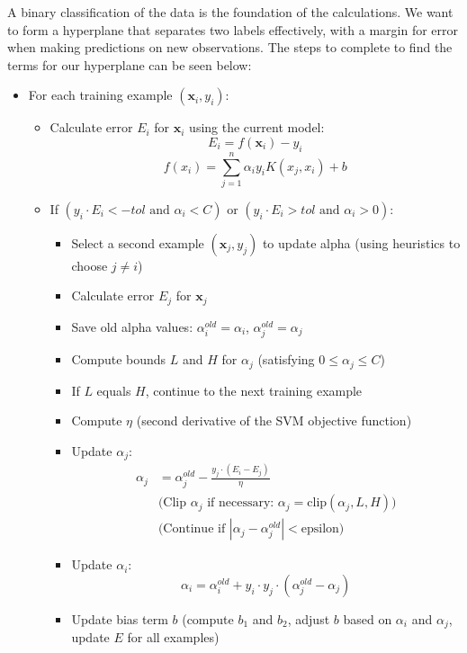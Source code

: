 \documentclass[12pt]{article}
\begin{document}
A binary classification of the data is the foundation of the calculations. We want to form a hyperplane that separates two labels effectively, with a margin for error when making predictions on new observations. The steps to complete to find the terms for our hyperplane can be seen below:

\begin{itemize}
    \item For each training example $(\mathbf{x}_i, y_i)$:
    \begin{itemize}
        \item Calculate error $E_i$ for $\mathbf{x}_i$ using the current model:
        \begin{equation*}
            E_i = f(\mathbf{x}_i) - y_i
        \end{equation*}
        \begin{equation*}
            f(x_i) = \sum_{j=1}^n \alpha_i y_i K (x_j,x_i) + b
        \end{equation*}
        \item If $(y_i \cdot E_i < -tol \text{ and } \alpha_i < C)$ or $(y_i \cdot E_i > tol \text{ and } \alpha_i > 0)$:
        \begin{itemize}
            \item Select a second example $(\mathbf{x}_j, y_j)$ to update alpha (using heuristics to choose $j \neq i$)
            \item Calculate error $E_j$ for $\mathbf{x}_j$
            \item Save old alpha values: $\alpha_i^{old} = \alpha_i$, $\alpha_j^{old} = \alpha_j$
            \item Compute bounds $L$ and $H$ for $\alpha_j$ (satisfying $0 \leq \alpha_j \leq C$)
            \item If $L$ equals $H$, continue to the next training example
            \item Compute $\eta$ (second derivative of the SVM objective function)
            \item Update $\alpha_j$:
            \begin{align*}
                \alpha_j &= \alpha_j^{old} - \frac{y_j \cdot (E_i - E_j)}{\eta} \\
                &\text{(Clip $\alpha_j$ if necessary: $\alpha_j = \text{clip}(\alpha_j, L, H)$)} \\
                &\text{(Continue if $|\alpha_j - \alpha_j^{old}| < \text{epsilon}$)}
            \end{align*}
            \item Update $\alpha_i$:
            \begin{equation*}
                \alpha_i = \alpha_i^{old} + y_i \cdot y_j \cdot (\alpha_j^{old} - \alpha_j)
            \end{equation*}
            \item Update bias term $b$ (compute $b_1$ and $b_2$, adjust $b$ based on $\alpha_i$ and $\alpha_j$, update $E$ for all examples)
        \end{itemize}
    \end{itemize}
\end{itemize}
\end{document}
